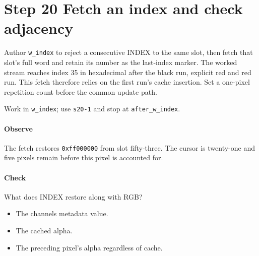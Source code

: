 \section{Step 20 Fetch an index and check adjacency}\label{qoi-s20}
Author \texttt{w\_index} to reject a consecutive INDEX to the same slot, then fetch that slot’s full word and retain its number as the last-index marker. The worked stream reaches index 35 in hexadecimal after the black run, explicit red and red run. This fetch therefore relies on the first run’s cache insertion. Set a one-pixel repetition count before the common update path.

Work in \texttt{w\_index}; use \texttt{s20-1} and stop at \texttt{after\_w\_index}.

\paragraph{Observe} The fetch restores \texttt{0xff000000} from slot fifty-three. The cursor is twenty-one and five pixels remain before this pixel is accounted for.

\paragraph{Check} What does INDEX restore along with RGB?
\begin{itemize}
  \item[A.] The channels metadata value.
  \item[B.] The cached alpha.
  \item[C.] The preceding pixel’s alpha regardless of cache.
\end{itemize}
